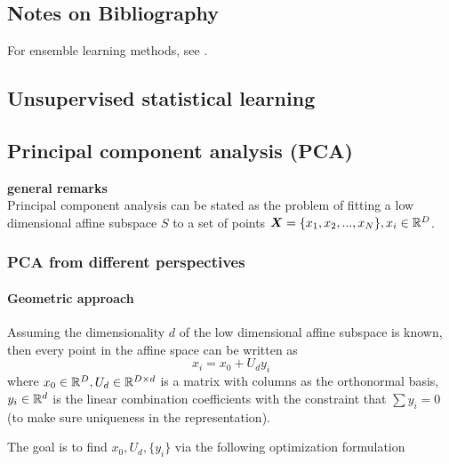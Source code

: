 \begin{refsection}
\section{Notes on Bibliography}
For ensemble learning methods, see \cite{seni2010ensemble}.




\printbibliography
\end{refsection}




\begin{refsection}
\startcontents[chapters]	
\chapter{Unsupervised statistical learning}

\section{Principal component analysis (PCA)}\label{ch:statistical-learning:sec:PCA}
\begin{mdframed}
\textbf{general remarks}\\
Principal component analysis can be stated as the problem of fitting a low dimensional affine subspace $S$ to a set of points $\bm{X}=\{x_1,x_2,...,x_N\},x_i\in \mathbb{R}^D$.\cite[19]{ma2002generalized}
\end{mdframed}

\subsection{PCA from different perspectives}
\subsubsection{Geometric approach}
\begin{mdframed}
Assuming the dimensionality $d$ of the low dimensional affine subspace is known, then every point in the affine space can be written as
$$x_i = x_0 + U_d y_i$$
where $x_0 \in \mathbb{R}^D, U_d \in \mathbb{R}^{D\times d}$ is a matrix with columns as the orthonormal basis, $y_i \in \mathbb{R}^d$ is the linear combination coefficients with the constraint that $\sum y_i = 0$ (to make sure uniqueness in the representation).

The goal is to find $x_0,U_d,\{y_i\}$ via the following optimization formulation
\end{mdframed}



\end{refsection}
